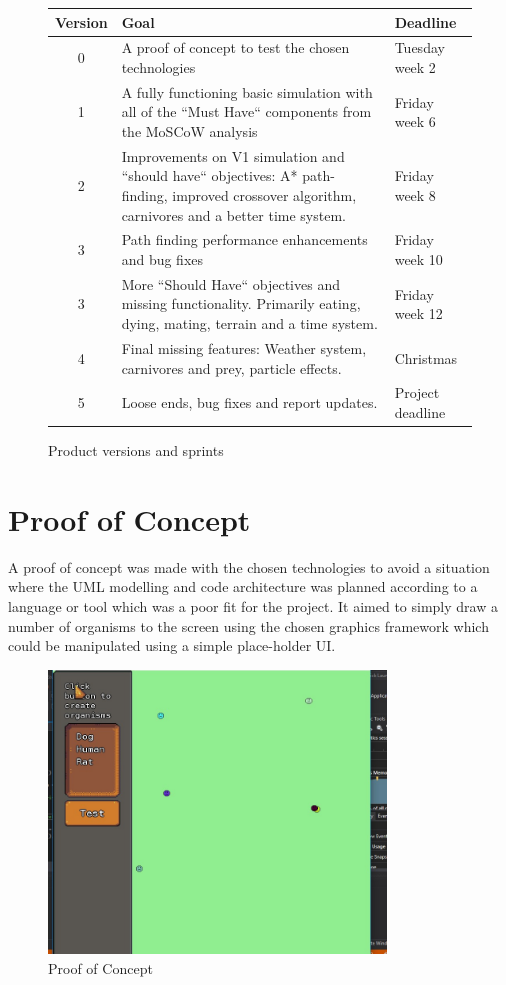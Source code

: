 \documentclass[a4paper, oneside, 11pt]{report}
\begin{document}
\smallskip 
\begin{figure}[H]
	\caption{Product versions and sprints} \label{version-table}
	\centering
	\begin{tabular}{c|p{}|l}
		Version & Goal & Deadline \\ \hline
		0 & A proof of concept to test the chosen technologies & Tuesday week 2 \\ \hline
		1 & A fully functioning basic simulation with all of the ``Must Have`` components from the MoSCoW analysis & Friday week 6 \\ \hline
		2 & Improvements on V1 simulation and ``should have`` objectives: A* path-finding, improved crossover algorithm, carnivores and a better time system. & Friday week 8 \\ \hline
		3 & Path finding performance enhancements and bug fixes & Friday week 10 \\ \hline
		3 & More ``Should Have`` objectives and missing functionality. Primarily eating, dying, mating, terrain and a time system. & Friday week 12 \\ \hline
		4 & Final missing features: Weather system, carnivores and prey, particle effects. & Christmas \\ \hline
		5 & Loose ends, bug fixes and report updates. & Project deadline \\ \hline
	\end{tabular}
\end{figure}
\smallskip 

\section{Proof of Concept}
A proof of concept was made with the chosen technologies to avoid a situation where the UML modelling and code architecture was planned according to a language or tool which was a poor fit for the project. It aimed to simply draw a number of organisms to the screen using the chosen graphics framework which could be manipulated using a simple place-holder UI.

\begin{figure}[H]
	\caption{Proof of Concept}\label{poc}
	\centering
	\includegraphics[width=0.8\textwidth]{poc}
\end{figure}
\end{document}
